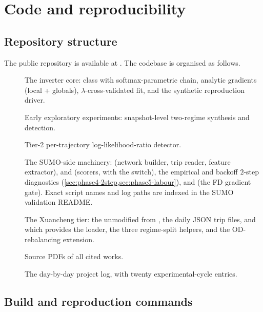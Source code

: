 \section{Code and reproducibility}
\label{app:repo}

\subsection{Repository structure}

The public repository is available at
\href{https://github.com/aaron-bendor/Masters}{}.
The codebase is organised as follows.

\begin{description}
\item[] The inverter core:  class with
softmax-parametric chain, analytic gradients (local + globals),
$\lambda$-cross-validated fit, and the synthetic reproduction driver.
\item[] Early exploratory experiments:
snapshot-level
two-regime synthesis and detection.
\item[] Tier-2 per-trajectory log-likelihood-ratio detector.
\item[] The SUMO-side machinery:
 (network builder, trip reader, feature
extractor),  and 
(scorers, with the  switch),
the empirical and backoff $2$-step diagnostics
(\cref{sec:phase4-2step,sec:phase5-labour}), and
 (the FD gradient gate). Exact script names
and log paths are indexed in the SUMO validation README.
\item[] The Xuancheng tier: the unmodified
 from \cite{ma2026xuancheng}, the daily JSON
trip files, and  which provides the loader,
the three regime-split helpers, and the OD-rebalancing extension.
\item[] Source PDFs of all cited works.
\item[] The day-by-day project log,
with twenty experimental-cycle entries.
\end{description}

\subsection{Build and reproduction commands}\label{app:build}

